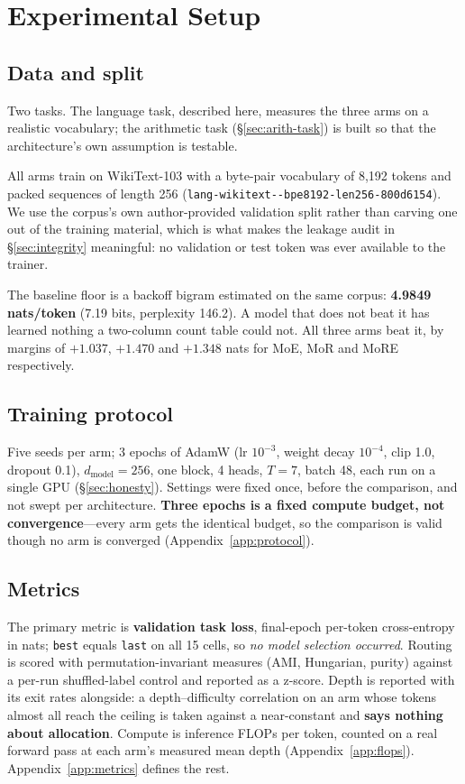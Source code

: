 \section{Experimental Setup}
\label{sec:setup}

\subsection{Data and split}
\label{sec:data}

Two tasks. The language task, described here, measures the three arms on a
realistic vocabulary; the arithmetic task (\S\ref{sec:arith-task}) is built so
that the architecture's own assumption is testable.

All arms train on WikiText-103 \citep{merity2017wikitext} with a byte-pair
vocabulary of 8{,}192 tokens and packed sequences of length 256
(\texttt{lang-\allowbreak wikitext--\allowbreak bpe8192-\allowbreak len256-\allowbreak 800d6154}). We use the corpus's own
author-provided validation split rather than carving one out of the training
material, which is what makes the leakage audit in \S\ref{sec:integrity}
meaningful: no validation or test token was ever available to the trainer.

The baseline floor is a backoff bigram estimated on the same corpus:
\textbf{4.9849 nats/token} (7.19 bits, perplexity 146.2). A model that does not
beat it has learned nothing a two-column count table could not. All three arms
beat it, by margins of $+1.037$, $+1.470$ and $+1.348$ nats for MoE, MoR and MoRE
respectively.

\subsection{Training protocol}\label{sec:protocol} Five seeds per arm; 3 epochs of AdamW (lr $10^{-3}$, weight decay $10^{-4}$, clip 1.0, dropout 0.1), $d_{\text{model}}=256$, one block, 4 heads, $T=7$, batch 48, each run on a single GPU (\S\ref{sec:honesty}). Settings were fixed once, before the comparison, and not swept per architecture. \textbf{Three epochs is a fixed compute budget, not convergence}---every arm gets the identical budget, so the comparison is valid though no arm is converged (Appendix~\ref{app:protocol}).
\subsection{Metrics}\label{sec:metrics} The primary metric is \textbf{validation task loss}, final-epoch per-token cross-entropy in nats; \texttt{best} equals \texttt{last} on all 15 cells, so \emph{no model selection occurred}. Routing is scored with permutation-invariant measures (AMI, Hungarian, purity) against a per-run shuffled-label control and reported as a z-score. Depth is reported with its exit rates alongside: a depth--difficulty correlation on an arm whose tokens almost all reach the ceiling is taken against a near-constant and \textbf{says nothing about allocation}. Compute is inference FLOPs per token, counted on a real forward pass at each arm's measured mean depth (Appendix~\ref{app:flops}). Appendix~\ref{app:metrics} defines the rest.


